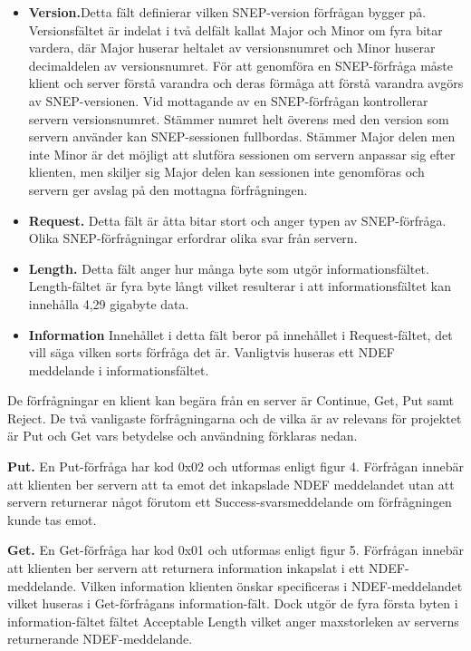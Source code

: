 \documentclass[11pt]{article}
\begin{document}
\begin{itemize}
\item \textbf{Version.}Detta fält definierar vilken SNEP-version förfrågan bygger på. Versionsfältet är indelat i två delfält kallat Major och Minor om fyra bitar vardera, där Major huserar heltalet av versionsnumret och Minor huserar decimaldelen av versionsnumret. För att genomföra en SNEP-förfråga måste klient och server förstå varandra och deras förmåga att förstå varandra avgörs av SNEP-versionen. Vid mottagande av en SNEP-förfrågan kontrollerar servern versionsnumret. Stämmer numret helt överens med den version som servern använder kan SNEP-sessionen fullbordas. Stämmer Major delen men inte Minor är det möjligt att slutföra sessionen om servern anpassar sig efter klienten, men skiljer sig Major delen kan sessionen inte genomföras och servern ger avslag på den mottagna förfrågningen.
\item \textbf{Request.} Detta fält är åtta bitar stort och anger typen av SNEP-förfråga. Olika SNEP-förfrågningar erfordrar olika svar från servern.
\item \textbf{Length.} Detta fält anger hur många byte som utgör informationsfältet. Length-fältet är fyra byte långt vilket resulterar i att informationsfältet kan innehålla 4,29 gigabyte data.
\item \textbf{Information} Innehållet i detta fält beror på innehållet i Request-fältet, det vill säga vilken sorts förfråga det är. Vanligtvis huseras ett NDEF meddelande i informationsfältet.
\end{itemize}

De förfrågningar en klient kan begära från en server är Continue, Get, Put samt Reject. De två vanligaste förfrågningarna och de vilka är av relevans för projektet är Put och Get vars betydelse och användning förklaras nedan.

\textbf{Put.} En Put-förfråga har kod 0x02 och utformas enligt figur 4. Förfrågan innebär att klienten ber servern att ta emot det inkapslade NDEF meddelandet utan att servern returnerar något förutom ett Success-svarsmeddelande om förfrågningen kunde tas emot. 



\textbf{Get.} En Get-förfråga har kod 0x01 och utformas enligt figur 5. Förfrågan innebär att klienten ber servern att returnera information inkapslat i ett NDEF-meddelande. Vilken information klienten önskar specificeras i NDEF-meddelandet vilket huseras i Get-förfrågans information-fält. Dock utgör de fyra första byten i information-fältet fältet Acceptable Length vilket anger maxstorleken av serverns returnerande NDEF-meddelande. 
\end{document}
